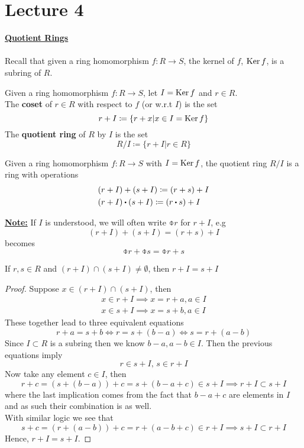 \documentclass[../Main.tex]{subfiles}
\begin{document}
\chapter{Lecture 4}
\underline{\textbf{\Large Quotient Rings}}\\~\\
Recall that given a ring homomorphism $f: R\to S$, the kernel of $f$, $\operatorname{Ker} f$, is a subring of $R$.
\begin{dfn}[title= Coset and Quotient Ring]
	Given a ring homomorphism $f:R\to S$, let $I= \operatorname{Ker} f$ and $r\in R$.\\
	The \textbf{coset} of $r \in R$ with respect to $f$ (or w.r.t $I$) is the set
	\[r+I \coloneqq \{r+x|x\in I = \operatorname{Ker} f\}\]
	The \textbf{quotient ring} of $R$ by $I$ is the set
	\[R/I\coloneqq \{r+I|r\in R\}\]
\end{dfn}
\begin{prop}
	Given a ring homomorphism $f: R \to S$ with $I = \operatorname{Ker} f$, the quotient ring $R/I$ is a ring with operations
	\begin{align*}
		&(r+I)+(s+I)\coloneqq (r+s)+I\\
		&(r+I)\rdot (s+I)\coloneqq (r\rdot s)+I
	\end{align*}
\end{prop}
\underline{\textbf{Note:}} If $I$ is understood, we will often write $\obar{r}$ for $r+I$, e.g
\[(r+I)+(s+I)=(r+s)+I\]
becomes
\[\obar{r}+\obar{s}=\obar{r+s}\]
\begin{lem}
	If $r,s\in R$ and $(r+I)\cap(s+I)\ne \emptyset$, then $r+I=s+I$
\end{lem}
\begin{proof}
	Suppose $x\in (r+I)\cap (s+I)$, then
	\begin{align*}
		x\in r+I \implies x = r+a, a\in I\\
		x\in s+I \implies x = s+b, a\in I
	\end{align*}
	These together lead to three equivalent equations
	\[r+a = s+b \Longleftrightarrow r=s+(b-a) \Longleftrightarrow s=r+(a-b)\]
	Since $I\subset R$ is a subring then we know $b-a,a-b\in I$. Then the previous equations imply
	\[r\in s+I,\, s\in r+I\]
	Now take any element $c\in I$, then
	\[r+c=(s+(b-a))+c=s+(b-a+c)\in s+I\implies r+I \subset s+I\]
	where the last implication comes from the fact that $b-a+c$ are elements in $I$ and as such their combination is as well.\\
	With similar logic we see that
	\[s+c=(r+(a-b))+c=r+(a-b+c) \in r+I \implies s+I \subset r+I\]
	Hence, $r+I=s+I$.
\end{proof}
\end{document}
